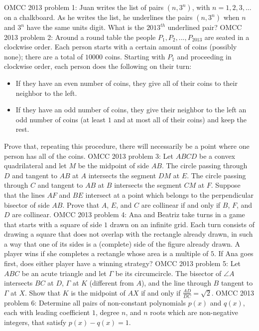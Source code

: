 OMCC 2013 problem 1:  Juan writes the list of pairs $(n, 3^n)$, with $n=1, 2, 3,...$ on a chalkboard. As he writes the list, he underlines the pairs $(n, 3^n)$ when $n$ and $3^n$ have the same units digit. What is the $2013^{th}$ underlined pair? 
OMCC 2013 problem 2:  Around a round table the people $P_1, P_2,..., P_{2013}$ are seated in a clockwise order. Each person starts with a certain amount of coins (possibly none); there are a total of $10000$ coins. Starting with $P_1$ and proceeding in clockwise order, each person does the following on their turn:
\begin{itemize}
  \item If they have an even number of coins, they give all of their coins to their neighbor to the left.

  \item If they have an odd number of coins, they give their neighbor to the left an odd number of coins (at least $1$ and at most all of their coins) and keep the rest.
\end{itemize}
Prove that, repeating this procedure, there will necessarily be a point where one person has all of the coins. 
OMCC 2013 problem 3:  Let $ABCD$ be a convex quadrilateral and let $M$ be the midpoint of side $AB$. The circle passing through $D$ and tangent to $AB$ at $A$ intersects the segment $DM$ at $E$. The circle passing through $C$ and tangent to $AB$ at $B$ intersects the segment $CM$ at $F$. Suppose that the lines $AF$ and $BE$ intersect at a point which belongs to the perpendicular bisector of side $AB$. Prove that $A$, $E$, and $C$ are collinear if and only if $B$, $F$, and $D$ are collinear. 
OMCC 2013 problem 4:  Ana and Beatriz take turns in a game that starts with a square of side $1$ drawn on an infinite grid. Each turn consists of drawing a square that does not overlap with the rectangle already drawn, in such a way that one of its sides is a (complete) side of the figure already drawn. A player wins if she completes a rectangle whose area is a multiple of $5$. If Ana goes first, does either player have a winning strategy? 
OMCC 2013 problem 5:  Let $ABC$ be an acute triangle and let $\Gamma$ be its circumcircle. The bisector of $\angle{A}$ intersects $BC$ at $D$, $\Gamma$ at $K$ (different from $A$), and the line through $B$ tangent to $\Gamma$ at $X$. Show that $K$ is the midpoint of $AX$ if and only if  $\frac{AD}{DC}=\sqrt{2}$. 
OMCC 2013 problem 6:  Determine all pairs of non-constant polynomials $p(x)$ and $q(x)$, each with leading coefficient $1$, degree $n$, and $n$ roots which are non-negative integers, that satisfy $p(x)-q(x)=1$. 

